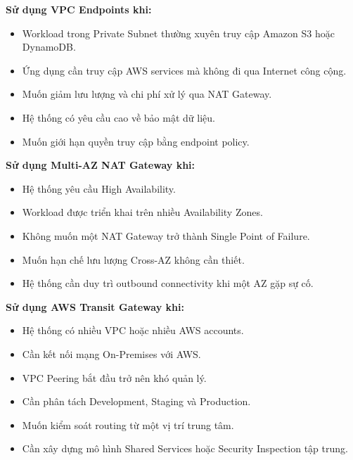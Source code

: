 \vspace{0.5em}\noindent\textbf{Sử dụng VPC Endpoints
khi:}\par

\begin{itemize}
\tightlist
\item
  Workload trong Private Subnet thường xuyên truy cập Amazon S3 hoặc
  DynamoDB.
\item
  Ứng dụng cần truy cập AWS services mà không đi qua Internet công cộng.
\item
  Muốn giảm lưu lượng và chi phí xử lý qua NAT Gateway.
\item
  Hệ thống có yêu cầu cao về bảo mật dữ liệu.
\item
  Muốn giới hạn quyền truy cập bằng endpoint policy.
\end{itemize}

\vspace{0.5em}\noindent\textbf{Sử dụng Multi-AZ NAT Gateway
khi:}\par

\begin{itemize}
\tightlist
\item
  Hệ thống yêu cầu High Availability.
\item
  Workload được triển khai trên nhiều Availability Zones.
\item
  Không muốn một NAT Gateway trở thành Single Point of Failure.
\item
  Muốn hạn chế lưu lượng Cross-AZ không cần thiết.
\item
  Hệ thống cần duy trì outbound connectivity khi một AZ gặp sự cố.
\end{itemize}

\vspace{0.5em}\noindent\textbf{Sử dụng AWS Transit Gateway
khi:}\par

\begin{itemize}
\tightlist
\item
  Hệ thống có nhiều VPC hoặc nhiều AWS accounts.
\item
  Cần kết nối mạng On-Premises với AWS.
\item
  VPC Peering bắt đầu trở nên khó quản lý.
\item
  Cần phân tách Development, Staging và Production.
\item
  Muốn kiểm soát routing từ một vị trí trung tâm.
\item
  Cần xây dựng mô hình Shared Services hoặc Security Inspection tập
  trung.
\end{itemize}

